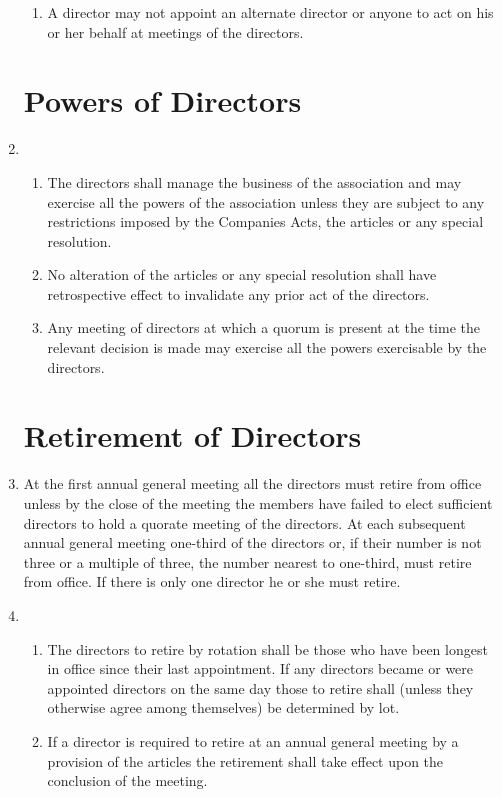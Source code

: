 \begin{enumerate}
\begin{enumerate}
  \item
    A director may not appoint an alternate director or anyone to act
    on his or her behalf at meetings of the directors.
  \end{enumerate}

\section{Powers of Directors}

\item
  \begin{enumerate}
  \item
    The directors shall manage the business of the association and may
    exercise all the powers of the association unless they are subject to
    any restrictions imposed by the Companies Acts, the articles or any
    special resolution.
  \item
    No alteration of the articles or any special resolution shall have
    retrospective effect to invalidate any prior act of the directors.
  \item
    Any meeting of directors at which a quorum is present at the time
    the relevant decision is made may exercise all the powers
    exercisable by the directors.
  \end{enumerate}

\section{Retirement of Directors}

\item
    At the first annual general meeting all the directors must retire from
    office unless by the close of the meeting the members have failed to
    elect sufficient directors to hold a quorate meeting of the directors. At
    each subsequent annual general meeting one-third of the directors or, if
    their number is not three or a multiple of three, the number nearest to
    one-third, must retire from office. If there is only one director he or she
    must retire.

\item
  \begin{enumerate}
  \item
    The directors to retire by rotation shall be those who have been
    longest in office since their last appointment. If any directors
    became or were appointed directors on the same day those to retire
    shall (unless they otherwise agree among themselves) be determined
    by lot.
  \item
    If a director is required to retire at an annual general meeting by
    a provision of the articles the retirement shall take effect upon
    the conclusion of the meeting.
  \end{enumerate}


\end{enumerate}
